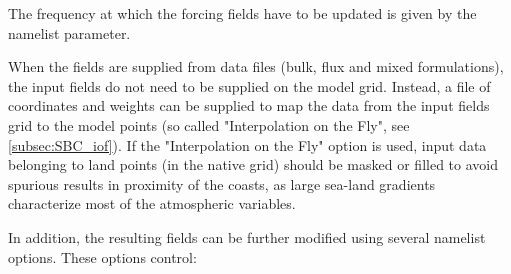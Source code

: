 \documentclass[../main/NEMO_manual]{subfiles}
\begin{document}
The frequency at which the forcing fields have to be updated is given by the  namelist parameter.

When the fields are supplied from data files (bulk, flux and mixed formulations),
the input fields do not need to be supplied on the model grid.
Instead, a file of coordinates and weights can be supplied to map the data from the input fields grid to
the model points (so called "Interpolation on the Fly", see \autoref{subsec:SBC_iof}).
If the "Interpolation on the Fly" option is used, input data belonging to land points (in the native grid)
should be masked or filled to avoid spurious results in proximity of the coasts, as
large sea-land gradients characterize most of the atmospheric variables.

In addition, the resulting fields can be further modified using several namelist options.
These options control:
\end{document}
